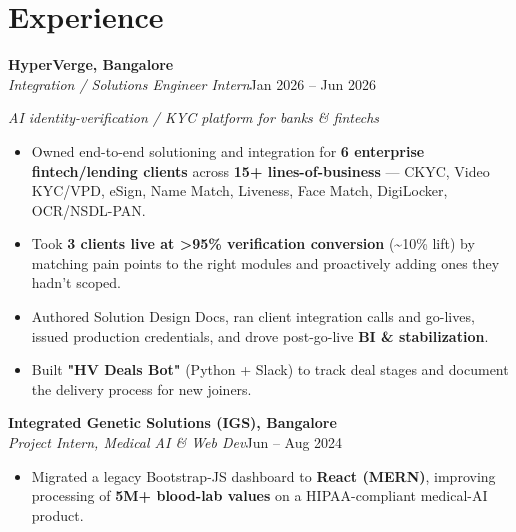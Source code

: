 \documentclass[10pt,a4paper]{article}
\begin{document}
\section*{Experience}
\vspace{1pt}\textbf{HyperVerge, Bangalore}\\
\textit{Integration / Solutions Engineer Intern}\hfill Jan 2026 -- Jun 2026\par\vspace{1pt}
{\small\itshape AI identity-verification / KYC platform for banks \& fintechs}\par\vspace{1pt}
\begin{itemize}
\item Owned end-to-end solutioning and integration for \textbf{6 enterprise fintech/lending clients} across \textbf{15+ lines-of-business} --- CKYC, Video KYC/VPD, eSign, Name Match, Liveness, Face Match, DigiLocker, OCR/NSDL-PAN.
\item Took \textbf{3 clients live at \textgreater{}95\% verification conversion} (\textasciitilde{}10\% lift) by matching pain points to the right modules and proactively adding ones they hadn't scoped.
\item Authored Solution Design Docs, ran client integration calls and go-lives, issued production credentials, and drove post-go-live \textbf{BI \& stabilization}.
\item Built \textbf{"HV Deals Bot"} (Python + Slack) to track deal stages and document the delivery process for new joiners.
\end{itemize}
\vspace{1pt}\textbf{Integrated Genetic Solutions (IGS), Bangalore}\\
\textit{Project Intern, Medical AI \& Web Dev}\hfill Jun -- Aug 2024\par\vspace{1pt}
\begin{itemize}
\item Migrated a legacy Bootstrap-JS dashboard to \textbf{React (MERN)}, improving processing of \textbf{5M+ blood-lab values} on a HIPAA-compliant medical-AI product.
\end{itemize}
\end{document}
